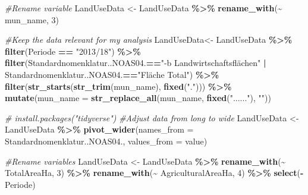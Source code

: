 \documentclass[
]{book}
\newenvironment{Shaded}{\begin{snugshade}}{\end{snugshade}}
\newcommand{\AttributeTok}[1]{\textcolor[rgb]{0.13,0.29,0.53}{#1}}
\newcommand{\CommentTok}[1]{\textcolor[rgb]{0.56,0.35,0.01}{\textit{#1}}}
\newcommand{\DecValTok}[1]{\textcolor[rgb]{0.00,0.00,0.81}{#1}}
\newcommand{\FunctionTok}[1]{\textcolor[rgb]{0.13,0.29,0.53}{\textbf{#1}}}
\newcommand{\NormalTok}[1]{#1}
\newcommand{\OtherTok}[1]{\textcolor[rgb]{0.56,0.35,0.01}{#1}}
\newcommand{\SpecialCharTok}[1]{\textcolor[rgb]{0.81,0.36,0.00}{\textbf{#1}}}
\newcommand{\StringTok}[1]{\textcolor[rgb]{0.31,0.60,0.02}{#1}}
\begin{document}
\begin{Shaded}
\begin{Highlighting}[]
\CommentTok{\#Rename variable}
\NormalTok{LandUseData }\OtherTok{\textless{}{-}}\NormalTok{ LandUseData }\SpecialCharTok{\%\textgreater{}\%}
  \FunctionTok{rename\_with}\NormalTok{(}\SpecialCharTok{\textasciitilde{}} \StringTok{\textquotesingle{}mun\_name\textquotesingle{}}\NormalTok{, }\DecValTok{3}\NormalTok{)}

\CommentTok{\#Keep the data relevant for my analysis}
\NormalTok{LandUseData}\OtherTok{\textless{}{-}}\NormalTok{ LandUseData }\SpecialCharTok{\%\textgreater{}\%}
  \FunctionTok{filter}\NormalTok{(Periode }\SpecialCharTok{==} \StringTok{"2013/18"}\NormalTok{) }\SpecialCharTok{\%\textgreater{}\%}
  \FunctionTok{filter}\NormalTok{(Standardnomenklatur..NOAS04.}\SpecialCharTok{==}\StringTok{"{-}b Landwirtschaftsflächen"} \SpecialCharTok{|}\NormalTok{ Standardnomenklatur..NOAS04.}\SpecialCharTok{==}\StringTok{"Fläche Total"}\NormalTok{) }\SpecialCharTok{\%\textgreater{}\%}
  \FunctionTok{filter}\NormalTok{(}\FunctionTok{str\_starts}\NormalTok{(}\FunctionTok{str\_trim}\NormalTok{(mun\_name), }\FunctionTok{fixed}\NormalTok{(}\StringTok{"."}\NormalTok{))) }\SpecialCharTok{\%\textgreater{}\%}
  \FunctionTok{mutate}\NormalTok{(}\AttributeTok{mun\_name =} \FunctionTok{str\_replace\_all}\NormalTok{(mun\_name, }\FunctionTok{fixed}\NormalTok{(}\StringTok{"......"}\NormalTok{), }\StringTok{""}\NormalTok{))}

\CommentTok{\# install.packages("tidyverse")}
\CommentTok{\#Adjust data from long to wide}
\NormalTok{LandUseData }\OtherTok{\textless{}{-}}\NormalTok{ LandUseData }\SpecialCharTok{\%\textgreater{}\%}
  \FunctionTok{pivot\_wider}\NormalTok{(}\AttributeTok{names\_from =}\NormalTok{ Standardnomenklatur..NOAS04., }\AttributeTok{values\_from =}\NormalTok{ value)}

\CommentTok{\#Rename variables}
\NormalTok{LandUseData }\OtherTok{\textless{}{-}}\NormalTok{ LandUseData }\SpecialCharTok{\%\textgreater{}\%}
  \FunctionTok{rename\_with}\NormalTok{(}\SpecialCharTok{\textasciitilde{}} \StringTok{\textquotesingle{}TotalAreaHa\textquotesingle{}}\NormalTok{, }\DecValTok{3}\NormalTok{) }\SpecialCharTok{\%\textgreater{}\%}
  \FunctionTok{rename\_with}\NormalTok{(}\SpecialCharTok{\textasciitilde{}} \StringTok{\textquotesingle{}AgriculturalAreaHa\textquotesingle{}}\NormalTok{, }\DecValTok{4}\NormalTok{) }\SpecialCharTok{\%\textgreater{}\%}
  \FunctionTok{select}\NormalTok{(}\SpecialCharTok{{-}}\NormalTok{Periode)}
\end{Highlighting}
\end{Shaded}
\end{document}
